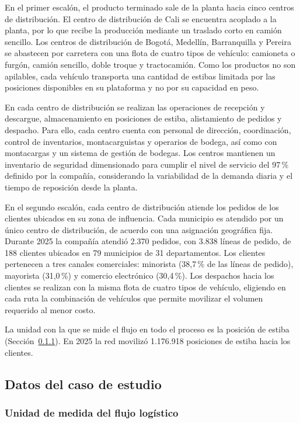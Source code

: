 \documentclass[fleqn, 11pt,letterpaper]{article}
\begin{document}
En el primer escalón, el producto terminado sale de la planta hacia cinco centros de distribución. El centro de distribución de Cali se encuentra acoplado a la planta, por lo que recibe la producción mediante un traslado corto en camión sencillo. Los centros de distribución de Bogotá, Medellín, Barranquilla y Pereira se abastecen por carretera con una flota de cuatro tipos de vehículo: camioneta o furgón, camión sencillo, doble troque y tractocamión. Como los productos no son apilables, cada vehículo transporta una cantidad de estibas limitada por las posiciones disponibles en su plataforma y no por su capacidad en peso.

En cada centro de distribución se realizan las operaciones de recepción y descargue, almacenamiento en posiciones de estiba, alistamiento de pedidos y despacho. Para ello, cada centro cuenta con personal de dirección, coordinación, control de inventarios, montacarguistas y operarios de bodega, así como con montacargas y un sistema de gestión de bodegas. Los centros mantienen un inventario de seguridad dimensionado para cumplir el nivel de servicio del 97\,\% definido por la compañía, considerando la variabilidad de la demanda diaria y el tiempo de reposición desde la planta.

En el segundo escalón, cada centro de distribución atiende los pedidos de los clientes ubicados en su zona de influencia. Cada municipio es atendido por un único centro de distribución, de acuerdo con una asignación geográfica fija. Durante 2025 la compañía atendió 2.370 pedidos, con 3.838 líneas de pedido, de 188 clientes ubicados en 79 municipios de 31 departamentos. Los clientes pertenecen a tres canales comerciales: minorista (38,7\,\% de las líneas de pedido), mayorista (31,0\,\%) y comercio electrónico (30,4\,\%). Los despachos hacia los clientes se realizan con la misma flota de cuatro tipos de vehículo, eligiendo en cada ruta la combinación de vehículos que permite movilizar el volumen requerido al menor costo.

La unidad con la que se mide el flujo en todo el proceso es la posición de estiba (Sección~\ref{sec:unidad_flujo}). En 2025 la red movilizó 1.176.918 posiciones de estiba hacia los clientes.

\subsection{Datos del caso de estudio}

\subsubsection{Unidad de medida del flujo logístico}
\label{sec:unidad_flujo}
\end{document}
